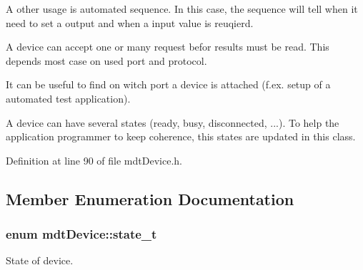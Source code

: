 A other usage is automated sequence. In this case, the sequence will tell when it need to set a output and when a input value is reuqierd.

A device can accept one or many request befor results must be read. This depends most case on used port and protocol.

It can be useful to find on witch port a device is attached (f.ex. setup of a automated test application).

A device can have several states (ready, busy, disconnected, ...). To help the application programmer to keep coherence, this states are updated in this class. 

Definition at line 90 of file mdtDevice.h.



\subsection{Member Enumeration Documentation}
\hypertarget{classmdt_device_a39c301b1fda803dba0c9ab98164a9d1e}{
\subsubsection[{state\_\-t}]{\setlength{\rightskip}{0pt plus 5cm}enum {\bf mdtDevice::state\_\-t}}}
\label{classmdt_device_a39c301b1fda803dba0c9ab98164a9d1e}


State of device. 

